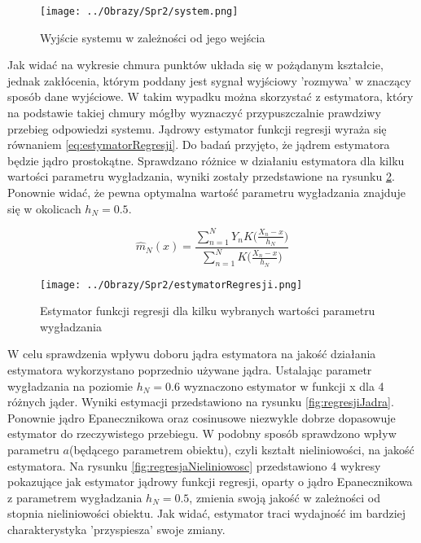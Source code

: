 \documentclass[12pt,a4paper]{article}
\begin{document}
\begin{figure}[H]
\centering
\texttt{[image: ../Obrazy/Spr2/system.png]} 
\caption{Wyjście systemu w zależności od jego wejścia}
\label{fig:system}
\end{figure}

Jak widać na wykresie chmura punktów układa się w pożądanym kształcie, jednak zakłócenia, którym poddany jest sygnał wyjściowy 'rozmywa' w znaczący sposób dane wyjściowe.
W takim wypadku można skorzystać z estymatora, który na podstawie takiej chmury mógłby wyznaczyć przypuszczalnie prawdziwy przebieg odpowiedzi systemu.
Jądrowy estymator funkcji regresji wyraża się równaniem \ref{eq:estymatorRegresji}.
Do badań przyjęto, że jądrem estymatora będzie jądro prostokątne.
Sprawdzano różnice w działaniu estymatora dla kilku wartości parametru wygładzania, wyniki zostały przedstawione na rysunku \ref{fig:estymatorRegresji}.
Ponownie widać, że pewna optymalna wartość parametru wygładzania znajduje się w okolicach $h_{N}=0.5$.

\begin{equation}\label{eq:estymatorRegresji}
\hat{m}_{N}(x)=\frac{\sum\limits^{N}_{n=1}Y_{n}K\bigg(\frac{X_{n} - x}{h_{N}}\bigg)}{\sum\limits^{N}_{n=1}K\bigg(\frac{X_{n} - x}{h_{N}}\bigg)}
\end{equation}

\begin{figure}[H]
\centering
\texttt{[image: ../Obrazy/Spr2/estymatorRegresji.png]} 
\caption{Estymator funkcji regresji dla kilku wybranych wartości parametru wygładzania}
\label{fig:estymatorRegresji}
\end{figure}


W celu sprawdzenia wpływu doboru jądra estymatora na jakość działania estymatora wykorzystano poprzednio używane jądra.
Ustalając parametr wygładzania na poziomie $h_{N}=0.6$ wyznaczono estymator w funkcji x dla 4 różnych jąder.
Wyniki estymacji przedstawiono na rysunku \ref{fig:regresjiJadra}.
Ponownie jądro Epanecznikowa oraz cosinusowe niezwykle dobrze dopasowuje estymator do rzeczywistego przebiegu.
W podobny sposób sprawdzono wpływ parametru $a$(będącego parametrem obiektu), czyli kształt nieliniowości, na jakość estymatora.
Na rysunku \ref{fig:regresjaNieliniowosc} przedstawiono 4 wykresy pokazujące jak estymator jądrowy funkcji regresji, oparty o jądro Epanecznikowa z parametrem wygładzania $h_{N}=0.5$, zmienia swoją jakość w zależności od stopnia nieliniowości obiektu.
Jak widać, estymator traci wydajność im bardziej charakterystyka 'przyspiesza' swoje zmiany.
\end{document}
